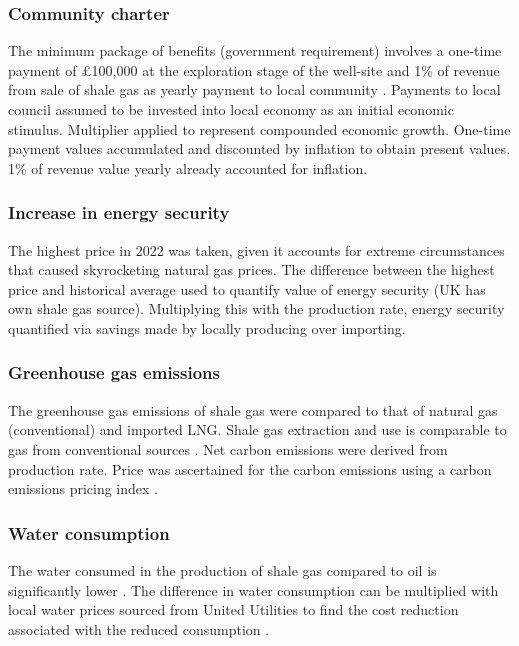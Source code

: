\documentclass[10pt]{article}
\begin{document}
\subsubsection{Community charter}
The minimum package of benefits (government requirement) involves a one-time payment of \pounds 100,000 at the exploration stage of the well-site and 1\% of revenue from sale of shale gas as yearly payment to local community \cite{007}. Payments to local council assumed to be invested into local economy as an initial economic stimulus. Multiplier applied to represent compounded economic growth. One-time payment values accumulated and discounted by inflation to obtain present values. 1\% of revenue value yearly already accounted for inflation.
\subsubsection{Increase in energy security}
The highest price in 2022 was taken, given it accounts for extreme circumstances that caused skyrocketing natural gas prices. The difference between the highest price and historical average \cite{008} used to quantify value of energy security (UK has own shale gas source). Multiplying this with the production rate, energy security quantified via savings made by locally producing over importing.
\subsubsection{Greenhouse gas emissions}
The greenhouse gas emissions of shale gas were compared to that of natural gas (conventional) and imported LNG. Shale gas extraction and use is comparable to gas from conventional sources \cite{009}. Net carbon emissions were derived from production rate. Price was ascertained for the carbon emissions using a carbon emissions pricing index \cite{018}.
\subsubsection{Water consumption}
The water consumed in the production of shale gas compared to oil is significantly lower \cite{017}. The difference in water consumption can be multiplied with local water prices sourced from United Utilities to find the cost reduction associated with the reduced consumption \cite{010,011}.
\end{document}
